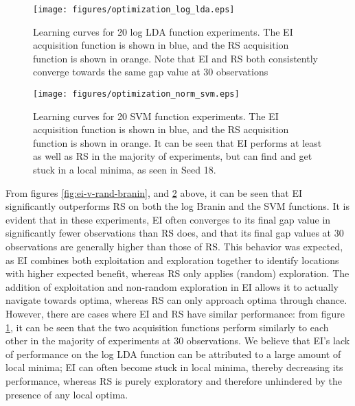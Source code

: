 \documentclass[11pt]{article}
\numberwithin{equation}{section}
\begin{document}
\begin{figure}[H]
  \centering
  \texttt{[image: figures/optimization\_log\_lda.eps]}
  \caption{Learning curves for 20 log LDA function experiments. The EI acquisition function is shown in blue, and the RS acquisition function is shown in orange. Note that EI and RS both consistently converge towards the same gap value at 30 observations}
  \label{fig:ei-v-rand-lda}
\end{figure}
\begin{figure}[H]
  \centering
  \texttt{[image: figures/optimization\_norm\_svm.eps]}
  \caption{Learning curves for 20 SVM function experiments. The EI acquisition function is shown in blue, and the RS acquisition function is shown in orange. It can be seen that EI performs at least as well as RS in the majority of experiments, but can find and get stuck in a local minima, as seen in Seed 18.}
  \label{fig:ei-v-rand-svm}
\end{figure}
From figures \ref{fig:ei-v-rand-branin}, and \ref{fig:ei-v-rand-svm} above, it can be seen that EI significantly outperforms RS on both the log Branin and the SVM functions.
It is evident that in these experiments, EI often converges to its final gap value in significantly fewer observations than RS does, and that its final gap values at 30 observations are generally higher than those of RS. This behavior was expected, as EI combines both exploitation and exploration together to identify locations with higher expected benefit, whereas RS only applies (random) exploration. The addition of exploitation and non-random exploration in EI allows it to actually navigate towards optima, whereas RS can only approach optima through chance. 
However, there are cases where EI and RS have similar performance: from figure \ref{fig:ei-v-rand-lda}, it can be seen that the two acquisition functions perform similarly to each other in the majority of experiments at 30 observations. 
We believe that EI's lack of performance on the log LDA function can be attributed to a large amount of local minima; EI can often become stuck in local minima, thereby decreasing its performance, whereas RS is purely exploratory and therefore unhindered by the presence of any local optima.
\end{document}
